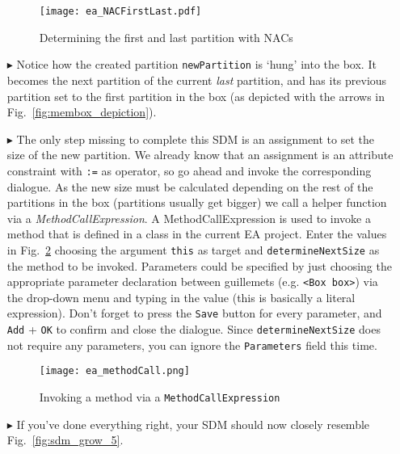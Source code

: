 \begin{itemize}
\begin{figure}[htbp]
\begin{center}
  \texttt{[image: ea\_NACFirstLast.pdf]} 
  \caption{Determining the first and last partition with NACs}  
  \label{fig:sdm_grow_3}
\end{center}
\end{figure}
 
\item[$\blacktriangleright$] Notice how the created partition \texttt{newPartition} is `hung' into the box. It becomes the next partition of the current
\emph{last} partition, and has its previous partition set to the first partition in the box (as depicted with the arrows in Fig.~\ref{fig:membox_depiction}).
  
\item[$\blacktriangleright$] The only step missing to complete this SDM is an assignment to set the size of the new partition. We already know that an
assignment is an attribute constraint with \texttt{:=} as operator, so go ahead and invoke the corresponding dialogue. As the new size must be calculated
depending on the rest of the partitions in the box (partitions usually get bigger) we call a helper function  via a
\emph{MethodCallExpression}. A MethodCallExpression is used to invoke a method that is defined in a class in the current EA project. Enter the values in
Fig.~\ref{fig:sdm_grow_4} choosing the argument \texttt{this} as target and \texttt{determineNextSize} as the method to be invoked.
Parameters could be specified by just choosing the appropriate parameter declaration between guillemets (e.g. \texttt{<Box box>}) via the drop-down menu and
typing in the value (this is basically a literal expression). Don't forget to press the \texttt{Save} button for every parameter, and \texttt{Add} + \texttt{OK}
to confirm and close the dialogue. Since \texttt{determineNextSize} does not require any parameters, you can ignore the \texttt{Parameters} field this time.
 
\begin{figure}[htbp]
\begin{center}
  \texttt{[image: ea\_methodCall.png]}
  \caption{Invoking a method via a \texttt{MethodCallExpression}}  
  \label{fig:sdm_grow_4} 
\end{center}
\end{figure}
\FloatBarrier

\item[$\blacktriangleright$]  If you've done everything right, your SDM should now closely resemble Fig.~\ref{fig:sdm_grow_5}. 


\end{itemize}
